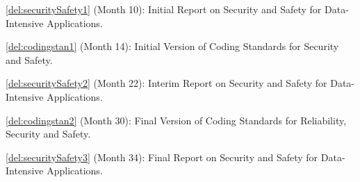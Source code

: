 \begin{Workpackage}{\thewpno}
\begin{Task}
\end{Task}


\vspace{-10pt}
\begin{WPDeliverables}
\begin{compactitem}
\item \ref{del:securitySafety1} (Month 10): Initial Report on Security and Safety for Data-Intensive Applications.
\item \ref{del:codingstan1} (Month 14): Initial Version of Coding Standards for Security and Safety.
\item \ref{del:securitySafety2} (Month 22): Interim Report on Security and Safety for Data-Intensive Applications.
\item \ref{del:codingstan2} (Month 30): Final Version of Coding Standards for Reliability, Security and Safety.
\item \ref{del:securitySafety3} (Month 34): Final Report on Security and Safety for Data-Intensive Applications.
\end{compactitem}
\end{WPDeliverables}
\end{Workpackage}

